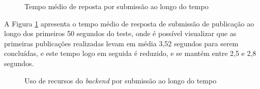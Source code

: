 \begin{figure}[H]
    \caption{Tempo médio de reposta por submissão ao longo do tempo}
    \centering
    \label{fig:create-response-over-time}
\end{figure}

A Figura \ref{fig:create-response-over-time} apresenta o tempo médio de resposta
de submissão de publicação ao longo dos primeiros 50 segundos do teste, onde é
possível visualizar que as primeiras publicações realizadas levam em média
3,52 segundos para serem concluídas, e este tempo logo em seguida é reduzido, e se
mantém entre 2,5 e 2,8 segundos.

\begin{figure}[H]
    \caption{Uso de recursos do \emph{backend} por submissão ao longo do tempo}
    \centering
    \label{fig:resource-usage-create-research}
\end{figure}

